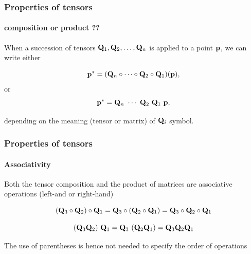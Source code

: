 \documentclass{beamer}
\begin{document}
\begin{frame}
\frametitle{Properties of tensors}
\framesubtitle{composition or product ??}

\vfill

When a succession of tensors ${\bf Q}_1, {\bf Q}_2, \ldots, {\bf Q}_n$ is applied to a point ${\bf p}$, we can write either 

\vfill

\[
{\bf p}^* =  ({\bf Q}_n\circ \cdots\circ {\bf Q}_2\circ {\bf Q}_1) ({\bf p}),
\]
or
\[
\p{p}^* =  \T{Q}_n\ \cdots\ \T{Q}_2\ \T{Q}_1\ \p{p},
\]

\vfill

depending on the meaning (tensor or matrix) of ${\bf Q}_i$ symbol.

\vfill

\end{frame}
\begin{frame}\frametitle{Properties of tensors}
\framesubtitle{Associativity}

\vfill

Both the tensor composition and the product of matrices are associative operations (left-and or right-hand)

\vfill

\[
 ({\bf Q}_3\circ {\bf Q}_2)\circ {\bf Q}_1
= {\bf Q}_3\circ ({\bf Q}_2\circ {\bf Q}_1)
=  {\bf Q}_3\circ {\bf Q}_2 \circ {\bf Q}_1
\]

\[
({\bf Q}_3 {\bf Q}_2)\ {\bf Q}_1
= {\bf Q}_3\ ({\bf Q}_2 {\bf Q}_1)
= {\bf Q}_3 {\bf Q}_2  {\bf Q}_1
\]

\vfill

The use of parentheses is hence not needed to specify the order of operations
\end{frame}
\end{document}
